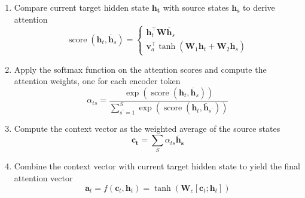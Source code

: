 \begin{enumerate}
    \item Compare current target hidden state $\boldsymbol{h_t}$ with source states $\boldsymbol{h_s}$ to derive attention 
    $$
    \operatorname{score}\left(\boldsymbol{h}_{t}, \overline{\boldsymbol{h}}_{s}\right)=\left\{\begin{array}{l}
    {\boldsymbol{h}_{t}^{\top} \boldsymbol{W} \overline{\boldsymbol{h}}_{s}} \\
    {\boldsymbol{v}_{a}^{\top} \tanh \left(\boldsymbol{W}_{1} \boldsymbol{h}_{t}+\boldsymbol{W}_{2} \overline{\boldsymbol{h}}_{s}\right)}
    \end{array}\right.
    $$
    
    \item Apply the softmax function on the attention scores and compute the attention weights, one for each encoder token
    $$
\alpha_{t s}=\frac{\exp \left(\operatorname{score}\left(\boldsymbol{h}_{t}, \overline{\boldsymbol{h}}_{s}\right)\right)}{\sum_{s^{\prime}=1}^{S} \exp \left(\operatorname{score}\left(\boldsymbol{h}_{t}, \overline{\boldsymbol{h}}_{s^{\prime}}\right)\right)}
$$
    
    \item Compute the context vector as the weighted average of the source states
    $$
    \boldsymbol{c_t} = \sum_{S} \alpha_{ts}\boldsymbol{ \overline{\boldsymbol{h}}_s}
    $$
    \item Combine the context vector with current target hidden state to yield the final attention vector
    $$
\boldsymbol{a}_{t}=f\left(\boldsymbol{c}_{t}, \boldsymbol{h}_{t}\right)=\tanh \left(\boldsymbol{W}_{c}\left[\boldsymbol{c}_{t} ; \boldsymbol{h}_{t}\right]\right)
$$
\end{enumerate}{}

